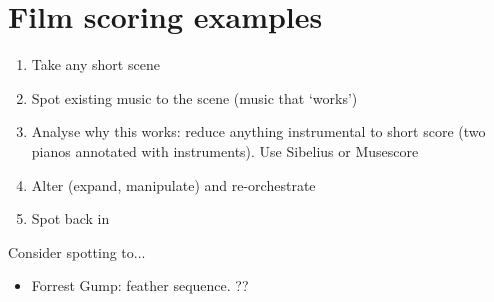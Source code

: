 
\chapter{Film scoring examples}
\label{examples}
\begin{enumerate}
\item Take any short scene
\item Spot existing music to the scene (music that `works')
\item Analyse why this works: reduce anything instrumental to short score (two pianos annotated with instruments). Use Sibelius or Musescore
\item Alter (expand, manipulate) and re-orchestrate
\item Spot back in
\end{enumerate} 

Consider spotting to...
\begin{itemize}
\item Forrest Gump: feather sequence.
??


\end{itemize}
